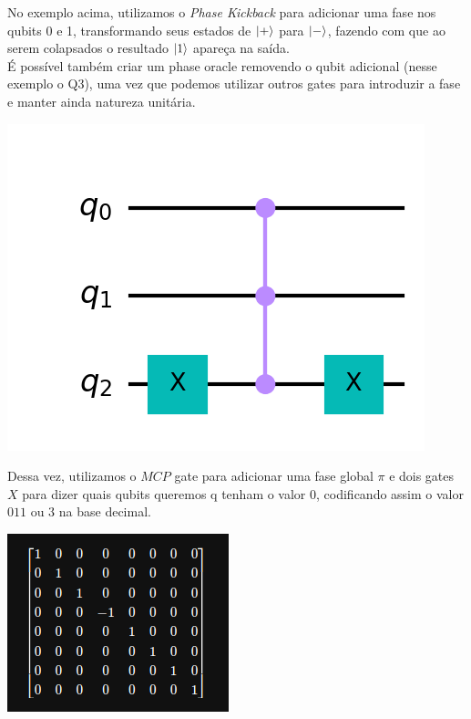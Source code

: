\documentclass{article}
\begin{document}
No exemplo acima, utilizamos o \textit{Phase Kickback} para adicionar uma fase nos qubits 0 e 1, transformando seus estados de $\mathinner{|{+}\rangle}$ para $\mathinner{|{-}\rangle}$, fazendo com que ao serem colapsados o resultado $\mathinner{|{1}\rangle}$ apareça na saída.\\

É possível também criar um phase oracle removendo o qubit adicional (nesse exemplo o Q3), uma vez que podemos utilizar outros gates para introduzir a fase e manter ainda natureza unitária.

\begin{center}
	\includegraphics[scale=0.3]{phase_oracle_2.png}
	\label{fig:phase-oracle-2}
\end{center}


Dessa vez, utilizamos o $MCP$ gate para adicionar uma fase global $\pi$ e dois gates $X$ para dizer quais qubits queremos q tenham o valor 0, codificando assim o valor $011$ ou $3$ na base decimal.

\begin{center}
	\includegraphics[scale=0.5]{phase_oracle_unitary.png}
	\label{fig:phase-oracle-unitary}
\end{center}
\end{document}
